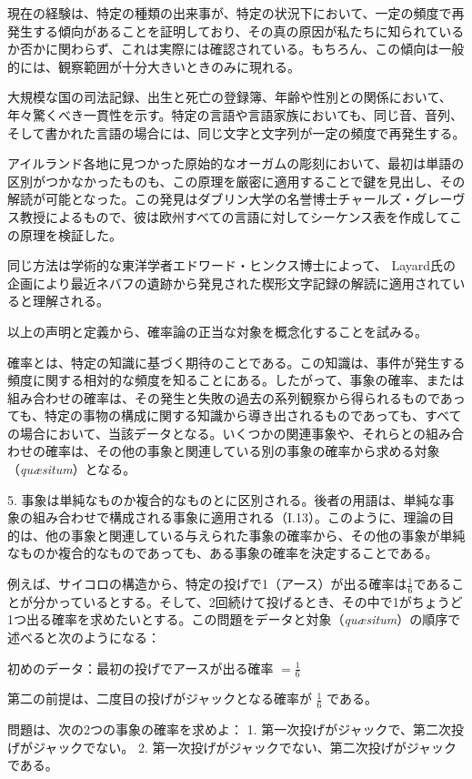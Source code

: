 \documentclass[a4paper,11pt,openany]{ltjsbook}
\begin{document}
現在の経験は、特定の種類の出来事が、特定の状況下において、一定の頻度で再発生する傾向があることを証明しており、その真の原因が私たちに知られているか否かに関わらず、これは実際には確認されている。もちろん、この傾向は一般的には、観察範囲が十分大きいときのみに現れる。

大規模な国の司法記録、出生と死亡の登録簿、年齢や性別との関係において、年々驚くべき一貫性を示す。特定の言語や言語家族においても、同じ音、音列、そして書かれた言語の場合には、同じ文字と文字列が一定の頻度で再発生する。

アイルランド各地に見つかった原始的なオーガムの彫刻において、最初は単語の区別がつかなかったものも、この原理を厳密に適用することで鍵を見出し、その解読が可能となった。この発見はダブリン大学の名誉博士チャールズ・グレーヴス教授によるもので、彼は欧州すべての言語に対してシーケンス表を作成してこの原理を検証した。

同じ方法は学術的な東洋学者エドワード・ヒンクス博士によって、 Layard氏の企画により最近ネバフの遺跡から発見された楔形文字記録の解読に適用されていると理解される。

以上の声明と定義から、確率論の正当な対象を概念化することを試みる。

確率とは、特定の知識に基づく期待のことである。この知識は、事件が発生する頻度に関する相対的な頻度を知ることにある。したがって、事象の確率、または組み合わせの確率は、その発生と失敗の過去の系列観察から得られるものであっても、特定の事物の構成に関する知識から導き出されるものであっても、すべての場合において、当該データとなる。いくつかの関連事象や、それらとの組み合わせの確率は、その他の事象と関連している別の事象の確率から求める対象（\textit{qu\ae{}situm}）となる。

5. 事象は単純なものか複合的なものとに区別される。後者の用語は、単純な事象の組み合わせで構成される事象に適用される（I.13）。このように、理論の目的は、他の事象と関連している与えられた事象の確率から、その他の事象が単純なものか複合的なものであっても、ある事象の確率を決定することである。

例えば、サイコロの構造から、特定の投げで1（アース）が出る確率は$\displaystyle\frac{1}{6}$であることが分かっているとする。そして、2回続けて投げるとき、その中で1がちょうど1つ出る確率を求めたいとする。この問題をデータと対象（\textit{qu\ae{}situm}）の順序で述べると次のようになる：

初めのデータ：最初の投げでアースが出る確率 $\displaystyle = \frac{1}{6}$

第二の前提は、二度目の投げがジャックとなる確率が $\frac{1}{6}$ である。

問題は、次の2つの事象の確率を求めよ：
1. 第一次投げがジャックで、第二次投げがジャックでない。
2. 第一次投げがジャックでない、第二次投げがジャックである。
\end{document}
